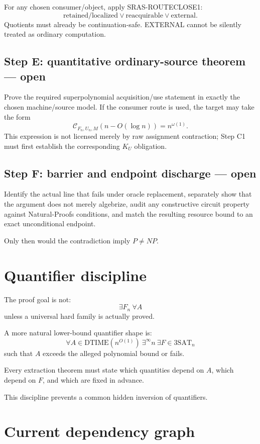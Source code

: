\documentclass[11pt]{article}
\theoremstyle{plain}
\theoremstyle{definition}
\theoremstyle{remark}
\begin{document}
For any chosen consumer/object, apply SRAS-ROUTECLOSE1:
\[
\text{retained/localized}
\vee
\text{reacquirable}
\vee
\text{external}.
\]
Quotients must already be continuation-safe.  EXTERNAL cannot be silently
treated as ordinary computation.

\subsection{Step E: quantitative ordinary-source theorem --- open}

Prove the required superpolynomial acquisition/use statement in exactly the
chosen machine/source model.  If the consumer route is used, the target may
take the form
\[
\mathcal C_{F_n,U_n,M}(n-O(\log n))=n^{\omega(1)}.
\]
This expression is not licensed merely by raw assignment contraction; Step C1
must first establish the corresponding \(K_U\) obligation.

\subsection{Step F: barrier and endpoint discharge --- open}

Identify the actual line that fails under oracle replacement, separately show
that the argument does not merely algebrize, audit any constructive circuit
property against Natural-Proofs conditions, and match the resulting resource
bound to an exact unconditional endpoint.

Only then would the contradiction imply \(P\ne NP\).

\section{Quantifier discipline}

The proof goal is not:
\[
\exists F_n\ \forall A
\]
unless a universal hard family is actually proved.

A more natural lower-bound quantifier shape is:
\[
\forall A\in\mathrm{DTIME}(n^{O(1)})
\ \exists^\infty n\
\exists F\in 3\mathrm{SAT}_n
\]
such that \(A\) exceeds the alleged polynomial bound or fails.

Every extraction theorem must state which quantities depend on \(A\), which
depend on \(F\), and which are fixed in advance.

This discipline prevents a common hidden inversion of quantifiers.

\section{Current dependency graph}
\end{document}
